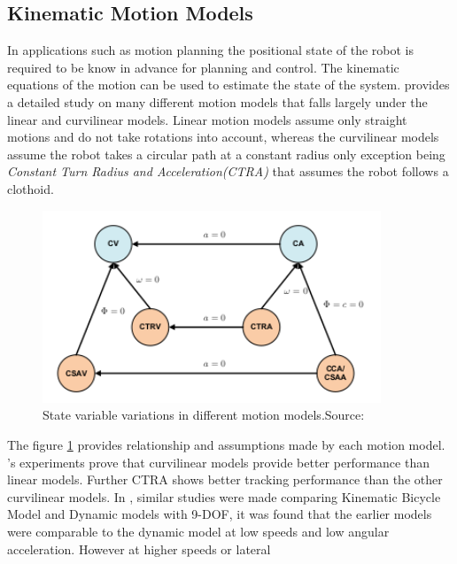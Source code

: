 \subsection{Kinematic Motion Models}
In applications such as motion planning the positional state of the robot is required to be know in advance for planning and control. The kinematic equations of the motion can be used to estimate the state of the system. \cite{R.Schubert} provides a detailed study on many different motion models that falls largely under the linear and curvilinear models. Linear motion models assume only straight motions and do not take rotations into account, whereas the curvilinear models assume the robot takes a circular path at a constant radius only exception being \textit{Constant Turn  Radius and Acceleration(CTRA)} that assumes the robot follows a clothoid. 
    \begin{figure}[h] 
        \includegraphics[width=0.9\textwidth]{images/MtnMdl.png}
        \caption{State variable variations in different motion models.Source:\cite{R.Schubert}}
        \label{fig:MtnMdl}
    \end{figure} 
The figure \ref{fig:MtnMdl} provides relationship and assumptions made by each motion model. \cite{R.Schubert}'s experiments prove that curvilinear models provide better performance than linear models. Further CTRA shows better tracking performance than the other curvilinear models. In \cite{Polack}, similar studies were made comparing Kinematic Bicycle Model and Dynamic models with 9-DOF, it was found that the earlier models were comparable to the dynamic model at low speeds and low angular acceleration. However at higher speeds or lateral
